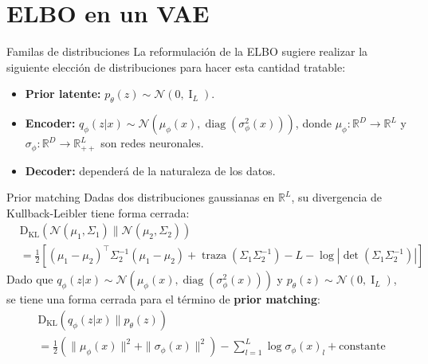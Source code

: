 \documentclass{beamer}
\newcommand{\R}{\mathbb{R}}
\begin{document}
\section{ELBO en un VAE}

\begin{frame}{Familas de distribuciones}
    La reformulación de la ELBO sugiere realizar la siguiente elección de distribuciones para hacer esta cantidad tratable:
    \begin{itemize}
        \item \textbf{Prior latente:} $p_\theta(z) \sim \mathcal{N}( 0, \operatorname{I}_L)$.
        \item \textbf{Encoder:} $q_\phi(z|x) \sim \mathcal{N}(\mu_\phi(x), \operatorname{diag}(\sigma^2_\phi(x)))$, donde $\mu_\phi:\R^D\to\R^L$ y $\sigma_\phi:\R^D\to\R^L_{++}$ son redes neuronales.
        \item \textbf{Decoder:} dependerá de la naturaleza de los datos.
    \end{itemize}
\end{frame}

\begin{frame}{Prior matching}
    Dadas dos distribuciones gaussianas en $\R^L$, su divergencia de Kullback-Leibler tiene forma cerrada:
    \begin{align*}
         & \operatorname{D_{KL}}\left(\mathcal{N}(\mu_1,\Sigma_1)\|\mathcal{N}(\mu_2,\Sigma_2)\right)                                                               \\
         & = \frac{1}{2}\left[(\mu_1-\mu_2)^\top\Sigma_2^{-1}(\mu_1-\mu_2) + \operatorname{traza}(\Sigma_1\Sigma_2^{-1})-L-\log|\det(\Sigma_1\Sigma_2^{-1})|\right]
    \end{align*}
    Dado que $q_\phi(z|x)\sim\mathcal{N}\left(\mu_\phi(x),\operatorname{diag}(\sigma_\phi^2(x))\right)$ y $p_\theta(z)\sim\mathcal{N}(0, \operatorname{I}_L)$, se tiene una forma cerrada para el término de \textbf{prior matching}:
    \begin{align*}
         & \operatorname{{D}_{KL}}\left(q_\phi(z|x)\| p_\theta(z)\right)                                                               \\
         & = \frac{1}{2}\left(\|\mu_\phi(x)\|^2 + \|\sigma_\phi(x)\|^2 \right) - \sum_{l=1}^L \log \sigma_\phi(x)_l + \text{constante}
    \end{align*}
\end{frame}
\end{document}
